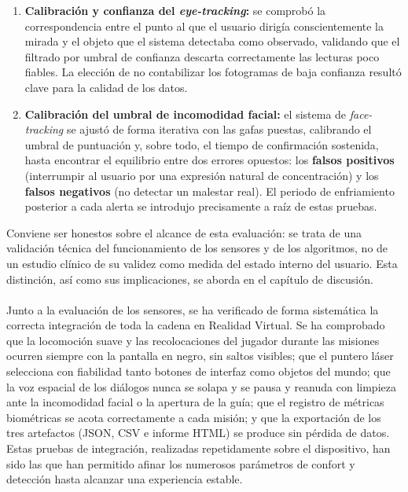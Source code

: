 \documentclass[12pt,twoside,titlepage]{report}
\begin{document}
\begin{enumerate}[label=\textbf{\arabic*.}, leftmargin=1.5cm, itemsep=0.5em]
  \item \textbf{Calibración y confianza del \textit{eye-tracking}:} se comprobó la correspondencia entre el punto al que el usuario dirigía conscientemente la mirada y el objeto que el sistema detectaba como observado, validando que el filtrado por umbral de confianza descarta correctamente las lecturas poco fiables.
La elección de no contabilizar los fotogramas de baja confianza resultó clave para la calidad de los datos.
  \item \textbf{Calibración del umbral de incomodidad facial:} el sistema de \textit{face-tracking} se ajustó de forma iterativa con las gafas puestas, calibrando el umbral de puntuación y, sobre todo, el tiempo de confirmación sostenida, hasta encontrar el equilibrio entre dos errores opuestos: los \textbf{falsos positivos} (interrumpir al usuario por una expresión natural de concentración) y los \textbf{falsos negativos} (no detectar un malestar real).
El periodo de enfriamiento posterior a cada alerta se introdujo precisamente a raíz de estas pruebas.
\end{enumerate}

Conviene ser honestos sobre el alcance de esta evaluación: se trata de una validación técnica del funcionamiento de los sensores y de los algoritmos, no de un estudio clínico de su validez como medida del estado interno del usuario.
Esta distinción, así como sus implicaciones, se aborda en el capítulo de discusión.\\
\\
Junto a la evaluación de los sensores, se ha verificado de forma sistemática la correcta integración de toda la cadena en Realidad Virtual.
Se ha comprobado que la locomoción suave y las recolocaciones del jugador durante las misiones ocurren siempre con la pantalla en negro, sin saltos visibles; que el puntero láser selecciona con fiabilidad tanto botones de interfaz como objetos del mundo; que la voz espacial de los diálogos nunca se solapa y se pausa y reanuda con limpieza ante la incomodidad facial o la apertura de la guía; que el registro de métricas biométricas se acota correctamente a cada misión; y que la exportación de los tres artefactos (JSON, CSV e informe HTML) se produce sin pérdida de datos.
Estas pruebas de integración, realizadas repetidamente sobre el dispositivo, han sido las que han permitido afinar los numerosos parámetros de confort y detección hasta alcanzar una experiencia estable.
\end{document}
